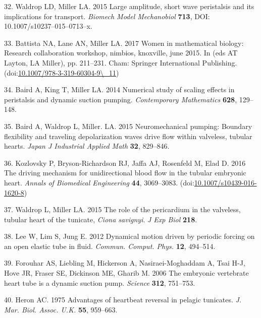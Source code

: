 \documentclass[
]{article}
\newenvironment{cslreferences}%
  {}%
  {\par}
\begin{document}
\begin{cslreferences}
\leavevmode\hypertarget{ref-Waldrop:peristalsis}{}%
32. Waldrop LD, Miller LA. 2015 Large amplitude, short wave peristalsis
and its implications for transport. \emph{Biomech Model Mechanobiol}
\textbf{713}, DOI: 10.1007/s10237--015--0713--x.

\leavevmode\hypertarget{ref-Battista:2017}{}%
33. Battista NA, Lane AN, Miller LA. 2017 Women in mathematical biology:
Research collaboration workshop, nimbios, knoxville, june 2015. In (eds
AT Layton, LA Miller), pp. 211--231. Cham: Springer International
Publishing.
(doi:\href{https://doi.org/10.1007/978-3-319-60304-9/_11}{10.1007/978-3-319-60304-9\textbackslash\_11})

\leavevmode\hypertarget{ref-Baird:2014}{}%
34. Baird A, King T, Miller LA. 2014 Numerical study of scaling effects
in peristalsis and dynamic suction pumping. \emph{Contemporary
Mathematics} \textbf{628}, 129--148.

\leavevmode\hypertarget{ref-Baird:2015}{}%
35. Baird A, Waldrop L, Miller. LA. 2015 Neuromechanical pumping:
Boundary flexibility and traveling depolarization waves drive flow
within valveless, tubular hearts. \emph{Japan J Industrial Applied Math}
\textbf{32}, 829--846.

\leavevmode\hypertarget{ref-Kozlovsky:2016}{}%
36. Kozlovsky P, Bryson-Richardson RJ, Jaffa AJ, Rosenfeld M, Elad D.
2016 The driving mechanism for unidirectional blood flow in the tubular
embryonic heart. \emph{Annals of Biomedical Engineering} \textbf{44},
3069--3083.
(doi:\href{https://doi.org/10.1007/s10439-016-1620-8}{10.1007/s10439-016-1620-8})

\leavevmode\hypertarget{ref-Waldrop:pericardium}{}%
37. Waldrop L, Miller LA. 2015 The role of the pericardium in the
valveless, tubular heart of the tunicate, \emph{Ciona savignyi}. \emph{J
Exp Biol} \textbf{218}.

\leavevmode\hypertarget{ref-Lee:2012}{}%
38. Lee W, Lim S, Jung E. 2012 Dynamical motion driven by periodic
forcing on an open elastic tube in fluid. \emph{Commun. Comput. Phys.}
\textbf{12}, 494--514.

\leavevmode\hypertarget{ref-Forouhar:2006}{}%
39. Forouhar AS, Liebling M, Hickerson A, Nasiraei-Moghaddam A, Tsai
H-J, Hove JR, Fraser SE, Dickinson ME, Gharib M. 2006 The embryonic
vertebrate heart tube is a dynamic suction pump. \emph{Science}
\textbf{312}, 751--753.

\leavevmode\hypertarget{ref-Heron:1975}{}%
40. Heron AC. 1975 Advantages of heartbeat reversal in pelagic
tunicates. \emph{J. Mar. Biol. Assoc. U.K.} \textbf{55}, 959--663.


\end{cslreferences}
\end{document}
